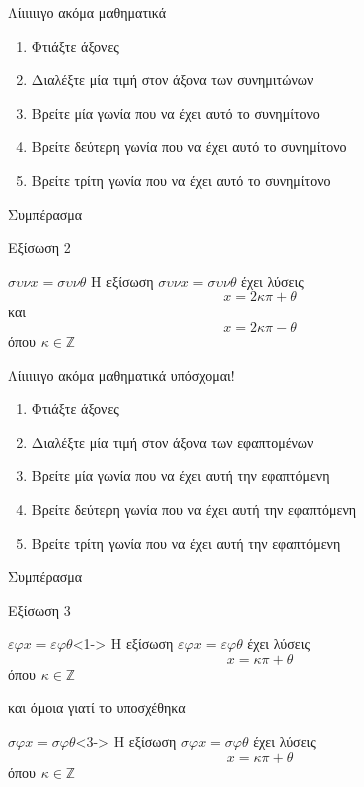 \documentclass{../presentation}
\begin{document}
\begin{frame}{Λίιιιιιγο ακόμα μαθηματικά}
  \begin{enumerate}
    \item<1-> Φτιάξτε άξονες
    \item<2-> Διαλέξτε μία τιμή στον άξονα των συνημιτώνων
    \item<3-> Βρείτε μία γωνία που να έχει αυτό το συνημίτονο
    \item<4-> Βρείτε δεύτερη γωνία που να έχει αυτό το συνημίτονο
    \item<5-> Βρείτε τρίτη γωνία που να έχει αυτό το συνημίτονο
  \end{enumerate}
   Συμπέρασμα
\end{frame}

\begin{frame}{Εξίσωση 2}
  \begin{block}{$συνx=συνθ$}
    Η εξίσωση $συνx=συνθ$ έχει λύσεις
    $$x=2κπ+θ$$
    και
    $$x=2κπ-θ$$
    όπου $κ\in\mathbb{Z}$
  \end{block}
\end{frame}

\begin{frame}{Λίιιιιιγο ακόμα μαθηματικά υπόσχομαι!}
  \begin{enumerate}
    \item<1-> Φτιάξτε άξονες
    \item<2-> Διαλέξτε μία τιμή στον άξονα των εφαπτομένων
    \item<3-> Βρείτε μία γωνία που να έχει αυτή την εφαπτόμενη
    \item<4-> Βρείτε δεύτερη γωνία που να έχει αυτή την εφαπτόμενη
    \item<5-> Βρείτε τρίτη γωνία που να έχει αυτή την εφαπτόμενη
  \end{enumerate}
   Συμπέρασμα
\end{frame}

\begin{frame}{Εξίσωση 3}
  \begin{block}{$εφx=εφθ$}<1->
    Η εξίσωση $εφx=εφθ$ έχει λύσεις
    $$x=κπ+θ$$
    όπου $κ\in\mathbb{Z}$
  \end{block}
   και όμοια γιατί το υποσχέθηκα

  \begin{block}{$σφx=σφθ$}<3->
    Η εξίσωση $σφx=σφθ$ έχει λύσεις
    $$x=κπ+θ$$
    όπου $κ\in\mathbb{Z}$
  \end{block}
\end{frame}
\end{document}
